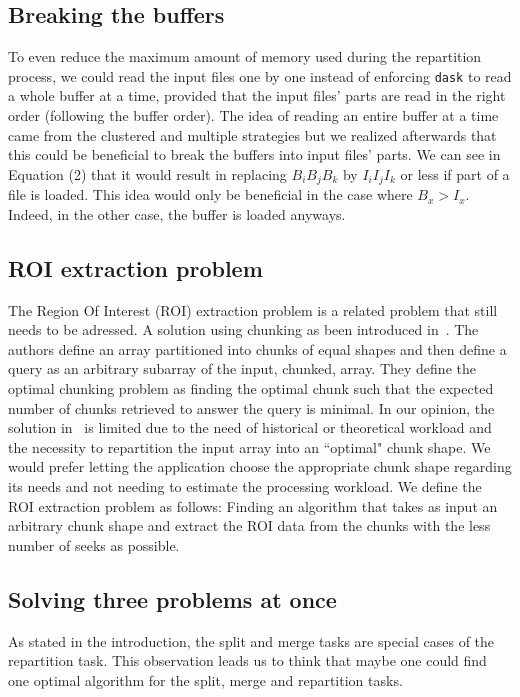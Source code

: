 \documentclass[conference]{IEEEtran}
\begin{document}
\subsection{Breaking the buffers}
To even reduce the maximum amount of memory used during the repartition process, we
could read the input files one by one instead of enforcing \texttt{dask} to read a whole
buffer at a time, provided that the input files' parts are read in the right
order (following the buffer order). The idea of reading an entire buffer at a
time came from the clustered and multiple strategies but we realized afterwards
that this could be beneficial to break the buffers into input files' parts. We
can see in Equation (2) that it would result in replacing $B_iB_jB_k$ by
$I_iI_jI_k$ or less if part of a file is loaded. This idea would only be
beneficial in the case where $B_x>I_x$. Indeed, in the other case, the buffer is
loaded anyways.

\subsection{ROI extraction problem}
The Region Of Interest (ROI) extraction problem is a related problem that still needs
to be adressed. A solution using chunking as been introduced in~\cite{optimal_chuking}. The authors
define an array partitioned into chunks of equal shapes and then define a
query as an arbitrary subarray of the input, chunked, array. They define the
optimal chunking problem as finding the optimal chunk such that the expected
number of chunks retrieved to answer the query is minimal. In our opinion, the
solution in~\cite{optimal_chuking} is limited due to the need of historical or theoretical workload
and the necessity to repartition the input array into an ``optimal" chunk shape. We
would prefer letting the application choose the appropriate chunk shape
regarding its needs and not needing to estimate the processing workload. We
define the ROI extraction problem as follows: Finding an algorithm that takes
as input an arbitrary chunk shape and extract the ROI data from the chunks with
the less number of seeks as possible.

\subsection{Solving three problems at once}
As stated in the introduction, the split and merge tasks are special cases of
the repartition task. This observation leads us to think that maybe one could find
one optimal algorithm for the split, merge and repartition tasks.
\end{document}
